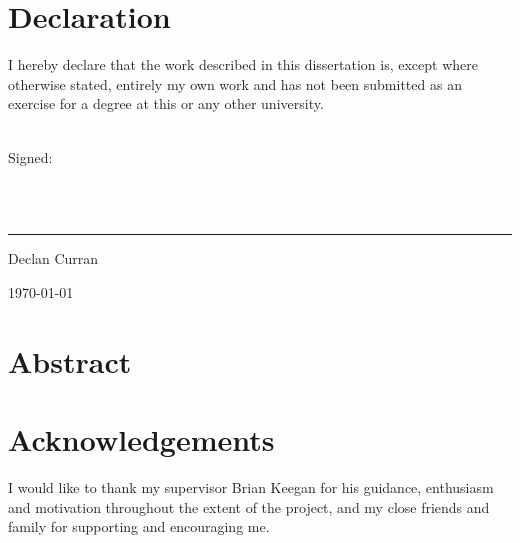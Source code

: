 \chapter*{Declaration}
I hereby declare that the work described in this dissertation is, except where otherwise stated, entirely my own work and has not been submitted as an exercise for a degree at this or any other university.

~\\
Signed:

~\\
~\\
\rule{8cm}{0.4pt}

Declan Curran

\today

\chapter*{Abstract}




\chapter*{Acknowledgements}
I would like to thank my supervisor Brian Keegan for his guidance, enthusiasm and motivation throughout the extent of the project, and my close friends and family for supporting and encouraging me.
